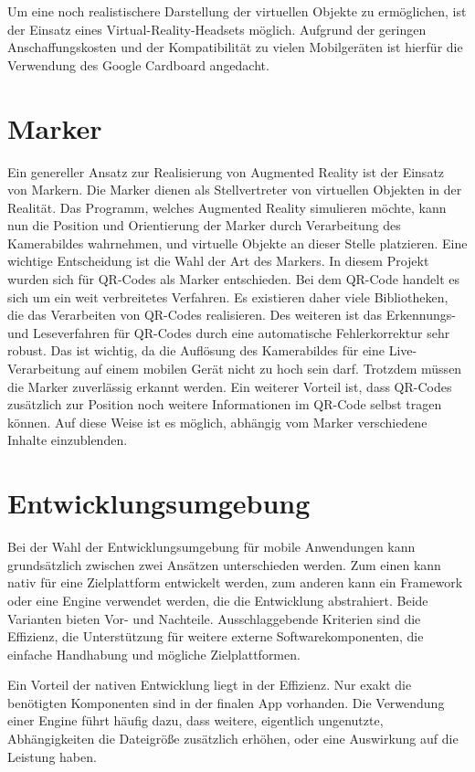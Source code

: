 Um eine noch realistischere Darstellung der virtuellen Objekte zu ermöglichen, ist der Einsatz eines Virtual-Reality-Headsets möglich. Aufgrund der geringen Anschaffungskosten und der Kompatibilität zu vielen Mobilgeräten ist hierfür die Verwendung des Google Cardboard angedacht.

\section{Marker}
Ein genereller Ansatz zur Realisierung von Augmented Reality ist der Einsatz von Markern. Die Marker dienen als Stellvertreter von virtuellen Objekten in der Realität. Das Programm, welches Augmented Reality simulieren möchte, kann nun die Position und Orientierung der Marker durch Verarbeitung des Kamerabildes wahrnehmen, und virtuelle Objekte an dieser Stelle platzieren.
Eine wichtige Entscheidung ist die Wahl der Art des Markers. In diesem Projekt wurden sich für QR-Codes als Marker entschieden.
Bei dem QR-Code handelt es sich um ein weit verbreitetes Verfahren. Es existieren daher viele Bibliotheken, die das Verarbeiten von QR-Codes realisieren. Des weiteren ist das Erkennungs- und Leseverfahren für QR-Codes durch eine automatische Fehlerkorrektur sehr robust. Das ist wichtig, da die Auflösung des Kamerabildes für eine Live-Verarbeitung auf einem mobilen Gerät nicht zu hoch sein darf. Trotzdem müssen die Marker zuverlässig erkannt werden. Ein weiterer Vorteil ist, dass QR-Codes zusätzlich zur Position noch weitere Informationen im QR-Code selbst tragen können. Auf diese Weise ist es möglich, abhängig vom Marker verschiedene Inhalte einzublenden.

\section{Entwicklungsumgebung}
Bei der Wahl der Entwicklungsumgebung für mobile Anwendungen kann grundsätzlich zwischen zwei Ansätzen unterschieden werden. Zum einen kann nativ für eine Zielplattform entwickelt werden, zum anderen kann ein Framework oder eine Engine verwendet werden, die die Entwicklung abstrahiert. Beide Varianten bieten Vor- und Nachteile. Ausschlaggebende Kriterien sind die Effizienz, die Unterstützung für weitere externe Softwarekomponenten, die einfache Handhabung und mögliche Zielplattformen.

Ein Vorteil der nativen Entwicklung liegt in der Effizienz. Nur exakt die benötigten Komponenten sind in der finalen App vorhanden. Die Verwendung einer Engine führt häufig dazu, dass weitere, eigentlich ungenutzte, Abhängigkeiten die Dateigröße zusätzlich erhöhen, oder eine Auswirkung auf die Leistung haben.

